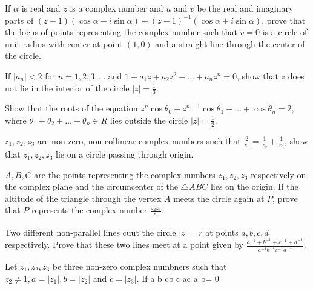 \item If $\alpha$ is real and $z$ is a complex number and $u$ and $v$ be the real and imaginary parts of $(z - 1)(\cos\alpha -
  i\sin\alpha) + (z - 1)^{-1}(\cos\alpha + i\sin\alpha)$, prove that the locus of points representing the complex number such that
  $v =0$ is a circle of unit radius with center at point $(1, 0)$ and a straight line through the center of the circle.
\item If $|a_n| < 2$ for $n = 1, 2, 3, \ldots$ and $1 + a_1z + a_2z^2 + \ldots + a_nz^n = 0$, show that $z$ does not lie in the
  interior of the circle $|z| = \frac{1}{3}$.
\item Show that the roots of the equation $z^n\cos\theta_0 + z^{n - 1}\cos\theta_1 + \ldots + \cos\theta_n = 2$, where $\theta_1 +
  \theta_2 + \ldots + \theta_n\in R$ lies outside the circle $|z| = \frac{1}{2}$.
\item $z_1, z_2, z_3$ are non-zero, non-collinear complex numbers such that $\frac{2}{z_1} = \frac{1}{z_2} + \frac{1}{z_3}$, show
  that $z_1, z_2, z_3$ lie on a circle passing through origin.
\item $A, B, C$ are the points representing the complex numbers $z_1,z_2,z_3$ respectively on the complex plane and the
  circumcenter of the $\triangle ABC$ lies on the origin. If the altitude of the triangle through the vertex $A$ meets the circle
  again at $P$, prove that $P$ represents the complex number $\frac{z_2z_3}{z_1}$.
\item Two different non-parallel lines cuut the circle $|z| = r$ at points $a, b, c, d$ respectively. Prove that these two lines
  meet at a point given by $\frac{a^{-1} + b^{-1} + c^{-1} + d^{-1}}{a^{-1}b^{-1}c^{-1}d^{-1}}$.
\item Let $z_1, z_2, z_3$ be three non-zero complex numbners such that $z_2\neq 1, a = |z_1|, b = |z_2|$ and $c =
  |z_3|$. If \startformula \startdeterminant \NC a \NC b \NC c\NR\NC b \NC c \NC a\NR\NC c \NC a \NC b\NR\stopdeterminant = 0\stopformula


